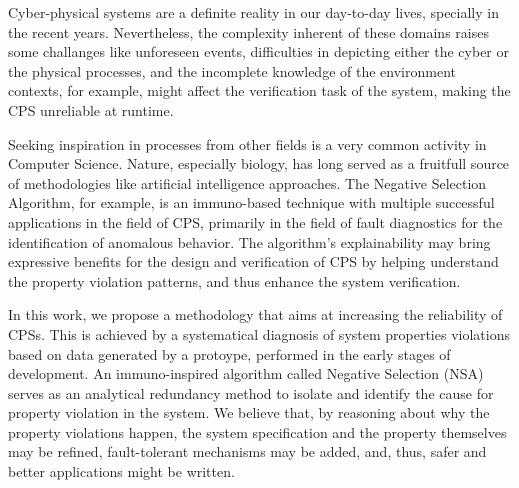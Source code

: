 Cyber-physical systems are a definite reality in our day-to-day lives, specially in the recent years. Nevertheless, the complexity inherent of these domains raises some challanges like unforeseen events, difficulties in depicting either the cyber or the physical processes, and the incomplete knowledge of the environment contexts, for example, might affect the verification task of the system, making the CPS unreliable at runtime. 

Seeking inspiration in processes from other fields is a very common activity in Computer Science. Nature, especially biology, has long served as a fruitfull source of methodologies like artificial intelligence approaches. The Negative Selection Algorithm, for example, is an immuno-based technique with multiple successful applications in the field of CPS, primarily in the field of fault diagnostics for the identification of anomalous behavior. The algorithm's explainability may bring expressive benefits for the design and verification of CPS by helping understand the property violation patterns, and thus enhance the system verification.

In this work, we propose a methodology that aims at increasing the reliability of CPSs. This is achieved by a systematical diagnosis of system properties violations based on data generated by a protoype, performed in the early stages of development. An immuno-inspired algorithm called Negative Selection (NSA) serves as an analytical redundancy method to isolate and identify the cause for property violation in the system. We believe that, by reasoning about why the property violations happen, the system specification and the property themselves may be refined, fault-tolerant mechanisms may be added, and, thus, safer and better applications might be written.